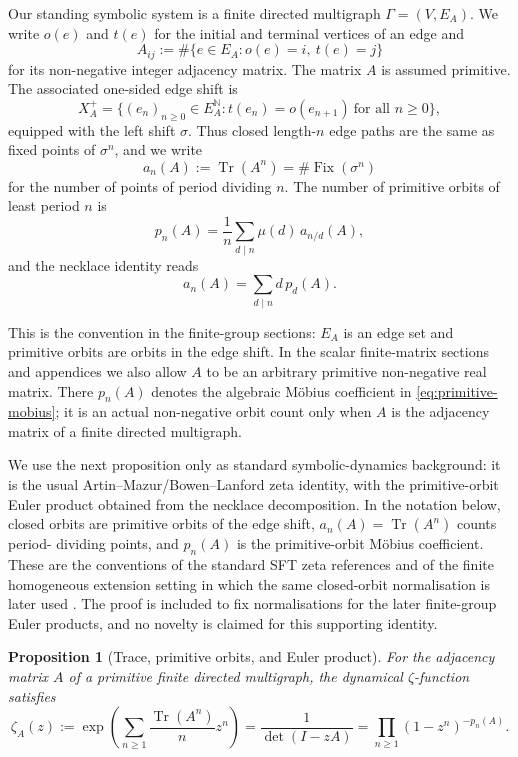 \documentclass[11pt,a4paper]{amsart}
\theoremstyle{plain}
\newtheorem{proposition}[theorem]{Proposition}
\theoremstyle{definition}
\theoremstyle{remark}
\DeclareMathOperator{\Tr}{Tr}
\newcommand{\NN}{\mathbb{N}}
\begin{document}
Our standing symbolic system is a finite directed multigraph
\(\Gamma=(V,E_A)\).  We write \(o(e)\) and \(t(e)\) for the initial and
terminal vertices of an edge and
\[
  A_{ij}:=\#\{e\in E_A:o(e)=i,\ t(e)=j\}
\]
for its non-negative integer adjacency matrix.  The matrix \(A\) is
assumed primitive.  The associated one-sided edge shift is
\[
  X_A^+
  =
  \bigl\{(e_n)_{n\ge 0}\in E_A^{\NN}:
    t(e_n)=o(e_{n+1})\ \text{for all }n\ge 0\bigr\},
\]
equipped with the left shift \(\sigma\).  Thus closed length-\(n\) edge
paths are the same as fixed points of \(\sigma^n\), and we write
\[
  a_n(A):=\Tr(A^n)=\#\operatorname{Fix}(\sigma^n)
\]
for the number of points of period dividing \(n\). The number of
primitive orbits of least period \(n\) is
\begin{equation}\label{eq:primitive-mobius}
  p_n(A)=\frac{1}{n}\sum_{d\mid n}\mu(d)\,a_{n/d}(A),
\end{equation}
and the necklace identity reads
\begin{equation}\label{eq:trace-primitive-identity}
  a_n(A)=\sum_{d\mid n}d\,p_d(A).
\end{equation}

This is the convention in the finite-group sections: \(E_A\) is an edge
set and primitive orbits are orbits in the edge shift.  In the scalar
finite-matrix sections and appendices we also allow \(A\) to be an
arbitrary primitive non-negative real matrix.  There \(p_n(A)\) denotes
the algebraic M\"obius coefficient in \eqref{eq:primitive-mobius}; it is
an actual non-negative orbit count only when \(A\) is the adjacency
matrix of a finite directed multigraph.

We use the next proposition only as standard symbolic-dynamics
background: it is the usual Artin--Mazur/Bowen--Lanford zeta identity,
with the primitive-orbit Euler product obtained from the necklace
decomposition.  In the notation below, closed orbits are primitive orbits
of the edge shift, \(a_n(A)=\Tr(A^n)\) counts period-
dividing points, and \(p_n(A)\) is the primitive-orbit M\"obius
coefficient.  These are the conventions of the standard SFT zeta
references
\cite{ArtinMazur1965PeriodicPoints,BowenLanford1970Zeta,LindMarcus1995,ParryPollicott1990Zeta}
and of the finite homogeneous extension setting in which the same
closed-orbit normalisation is later used
\cite{NooraniParry1992ChebotarevShifts}.  The proof is included to fix
normalisations for the later finite-group Euler products, and no novelty is
claimed for this supporting identity.

\begin{proposition}[Trace, primitive orbits, and Euler product]
  \label{prop:prelim-trace-primitive}
  For the adjacency matrix \(A\) of a primitive finite directed
  multigraph, the dynamical \(\zeta\)-function
  satisfies
  \begin{equation}\label{eq:zeta-def}
    \zeta_A(z)
    :=\exp\!\left(\sum_{n\ge 1}\frac{\Tr(A^n)}{n}z^n\right)
    =\frac{1}{\det(I-zA)}
    =\prod_{n\ge 1}(1-z^n)^{-p_n(A)}.
  \end{equation}
\end{proposition}
\end{document}
